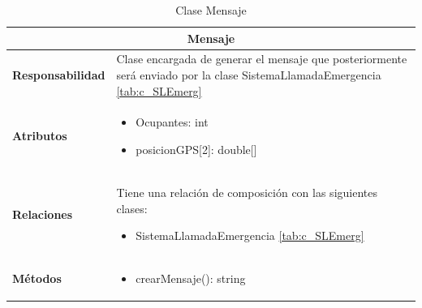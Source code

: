 \begin{table}[H]
\begin{center}
\begin{tabular}{p{} p{11cm}}
\multicolumn{2}{c}{\textbf{Mensaje} } \\ \hline \hline
\textbf{Responsabilidad} &   Clase encargada de generar el mensaje que posteriormente será enviado por la clase SistemaLlamadaEmergencia \ref{tab:c_SLEmerg}  \\ \hline
\textbf{Atributos} & \begin{itemize}
                      \item Ocupantes: int
                      \item posicionGPS[2]: double[]
                    \end{itemize}\\ \hline
\textbf{Relaciones} & \par Tiene una relación de composición con las siguientes clases:
                      \begin{itemize}
                        \item SistemaLlamadaEmergencia \ref{tab:c_SLEmerg}
                      \end{itemize}

                      \\ \hline

\textbf{Métodos} &  \begin{itemize}
                      \item crearMensaje(): string
                    \end{itemize}\\ \hline
\end{tabular}
\caption{Clase Mensaje}
\label{tab:c_mensaje}
\end{center}
\end{table}






